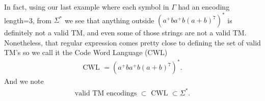 \documentclass{report}
\begin{document}
\begin{itemize}
\begin{itemize}
            \end{itemize}
            \bigbreak \noindent 
            In fact, using our last example where each symbol in $\Gamma$ had an encoding length=3, from $\Sigma^{*} $ we see that anything outside $(a^{+}ba^{+}b(a+b)^{7})^{*} $ is definitely not a valid TM, and even some of those strings are not a valid TM.
            \bigbreak \noindent 
            Nonetheless, that regular expression comes pretty close to defining the set of valid TM's so we call it the Code Word Language (CWL)
            \begin{align*}
                \text{CWL } = (a^{+}ba^{+}b(a+b)^{7})^{*}
            .\end{align*}
            \bigbreak \noindent 
            And we note
            \begin{align*}
                \text{valid TM encodings } \subset   \text{ CWL } \subset \Sigma^{*}
            .\end{align*}
        

    \end{itemize}

    \pagebreak 
\end{document}
